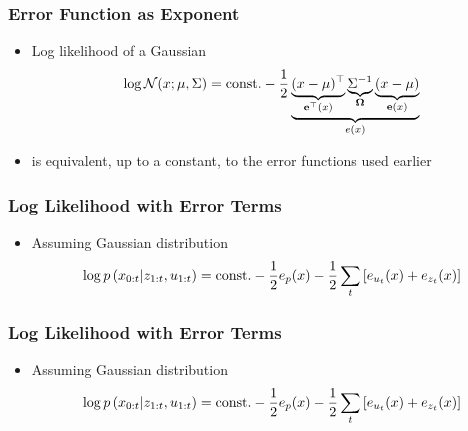 \begin{frame}
    \frametitle{Error Function as Exponent}
    
    \begin{itemize}
        \item Log likelihood of a Gaussian
        \begin{equation*}
            \log \mathcal{N}(x; \mu, \Sigma) =  \text{const.} - \dfrac{1}{2} \underbrace{\underbrace{(x - \mu)^{\top}}_{\boldsymbol{\mathbf{e}}^{\top}(x)} \underbrace{{\Sigma}^{-1}}_{\boldsymbol{\mathbf{\Omega}}} \underbrace{(x - \mu)}_{\boldsymbol{\mathbf{e}}(x)}}_{e(x)}
        \end{equation*}
        \item is equivalent, up to a constant, to the error functions used earlier
    \end{itemize}
    
\end{frame}

\begin{frame}
    \frametitle{Log Likelihood with Error Terms}
    
    \begin{itemize}
        \item Assuming Gaussian distribution
        \begin{equation*}
            \log p\left( x_{0:t} | z_{1:t}, u_{1:t} \right) = \text{const.} - \dfrac{1}{2} e_{p}(x) -  \dfrac{1}{2} \sum_{t} \left[ e_{u_{t}}(x) + e_{z_{t}}(x)\right]
        \end{equation*}
    \end{itemize}
    
\end{frame}

\begin{frame}
    \frametitle{Log Likelihood with Error Terms}
    
    \begin{itemize}
        \item Assuming Gaussian distribution
        \begin{equation*}
            \log p\left( x_{0:t} | z_{1:t}, u_{1:t} \right) = \text{const.} - \dfrac{1}{2} e_{p}(x) -  \dfrac{1}{2} \sum_{t} \left[ e_{u_{t}}(x) + e_{z_{t}}(x)\right]
        \end{equation*}
    \end{itemize}
    
\end{frame}

